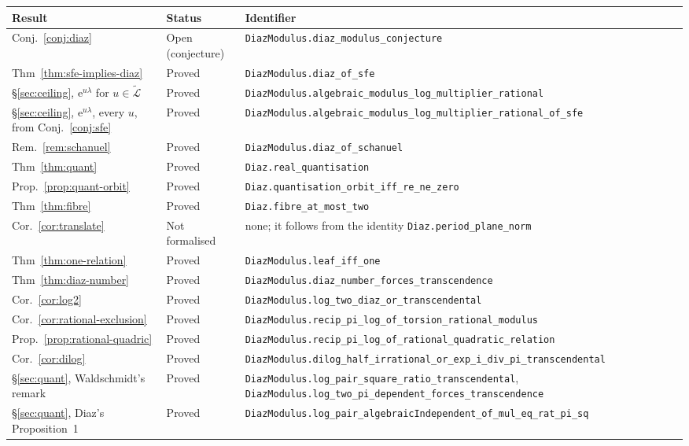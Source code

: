 \documentclass[11pt,a4paper]{article}
\theoremstyle{plain}
\theoremstyle{definition}
\newcommand{\e}{\mathrm{e}}
\newcommand{\aLogs}{\widetilde{\mathcal{L}}}
\begin{document}
\begin{center}
\footnotesize
\begin{longtable}{@{}llp{6.2cm}@{}}
\textbf{Result} & \textbf{Status} & \textbf{Identifier} \\
\hline
\endhead
Conj.~\ref{conj:diaz} & Open (conjecture) & \nolinkurl{DiazModulus.diaz_modulus_conjecture} \\
Thm~\ref{thm:sfe-implies-diaz} & Proved & \nolinkurl{DiazModulus.diaz_of_sfe} \\
\S\ref{sec:ceiling}, $\e^{u\lambda}$ for $u\in\aLogs$ & Proved & \nolinkurl{DiazModulus.algebraic_modulus_log_multiplier_rational} \\
\S\ref{sec:ceiling}, $\e^{u\lambda}$, every $u$, from Conj.~\ref{conj:sfe} & Proved & \nolinkurl{DiazModulus.algebraic_modulus_log_multiplier_rational_of_sfe} \\
Rem.~\ref{rem:schanuel} & Proved & \nolinkurl{DiazModulus.diaz_of_schanuel} \\
Thm~\ref{thm:quant} & Proved & \nolinkurl{Diaz.real_quantisation} \\
Prop.~\ref{prop:quant-orbit} & Proved & \nolinkurl{Diaz.quantisation_orbit_iff_re_ne_zero} \\
Thm~\ref{thm:fibre} & Proved & \nolinkurl{Diaz.fibre_at_most_two} \\
Cor.~\ref{cor:translate} & Not formalised & none; it follows from the identity \nolinkurl{Diaz.period_plane_norm} \\
Thm~\ref{thm:one-relation} & Proved & \nolinkurl{DiazModulus.leaf_iff_one} \\
Thm~\ref{thm:diaz-number} & Proved & \nolinkurl{DiazModulus.diaz_number_forces_transcendence} \\
Cor.~\ref{cor:log2} & Proved & \nolinkurl{DiazModulus.log_two_diaz_or_transcendental} \\
Cor.~\ref{cor:rational-exclusion} & Proved & \nolinkurl{DiazModulus.recip_pi_log_of_torsion_rational_modulus} \\
Prop.~\ref{prop:rational-quadric} & Proved & \nolinkurl{DiazModulus.recip_pi_log_of_rational_quadratic_relation} \\
Cor.~\ref{cor:dilog} & Proved & \nolinkurl{DiazModulus.dilog_half_irrational_or_exp_i_div_pi_transcendental} \\
\S\ref{sec:quant}, Waldschmidt's remark & Proved & \nolinkurl{DiazModulus.log_pair_square_ratio_transcendental}, \nolinkurl{DiazModulus.log_two_pi_dependent_forces_transcendence} \\
\S\ref{sec:quant}, Diaz's Proposition~1 & Proved & \nolinkurl{DiazModulus.log_pair_algebraicIndependent_of_mul_eq_rat_pi_sq} \\

\end{longtable}
\end{center}
\end{document}

